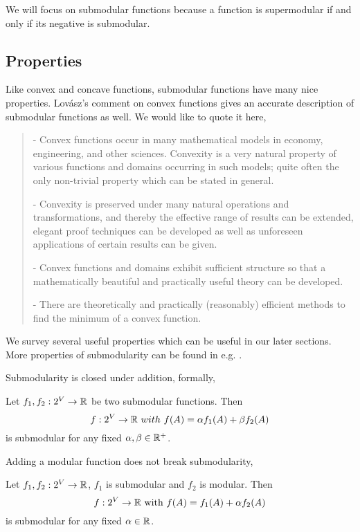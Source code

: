 We will focus on submodular functions because a function is supermodular if and only if its negative is submodular. 



\subsection{Properties}
Like convex and concave functions, submodular functions have many nice properties. Lov{\'a}sz's comment on convex functions \cite{L83} gives an accurate description of submodular functions as well. We would like to quote it here, 
\begin{quote}
 - Convex functions occur in many mathematical models in economy,
engineering, and other sciences. Convexity is a very natural property
of various functions and domains occurring in such models; quite
often the only non-trivial property which can be stated in general.

- Convexity is preserved under many natural operations and
transformations, and thereby the effective range of results can be
extended, elegant proof techniques can be developed as well as
unforeseen applications of certain results can be given.

- Convex functions and domains exhibit sufficient structure so that a
mathematically beautiful and practically useful theory can be
developed.

- There are theoretically and practically (reasonably) efficient methods
to find the minimum of a convex function.
\end{quote}

We survey several useful properties which can be useful in our later sections. More properties of submodularity can be found in e.g. \cite{B14,F05}.





Submodularity is closed under addition, formally,
\begin{property}
  \label{prop:addition}
  Let $f_1, f_2: 2^V \rightarrow \mathbb{R}$ be two submodular functions. Then 
  $$f: 2^V\rightarrow \mathbb{R}~{with}~ f(A) = \alpha f_1(A) + \beta f_2(A)$$ 
is submodular for any fixed $\alpha, \beta \in \mathbb{R}^+$.
\end{property}


Adding a modular function does not break submodularity,
\begin{property}
  \label{prop:modular}
  Let $f_1, f_2: 2^V \rightarrow \mathbb{R}$, $f_1$ is submodular and $f_2$ is modular. Then
  $$f: 2^V \rightarrow \mathbb{R}~\text{with}~ f(A) = f_1(A) + \alpha f_2(A)$$
is submodular for any fixed $\alpha \in \mathbb{R}$.
\end{property}

